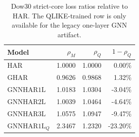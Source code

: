 \begin{table}[H]
\centering
\small
\begin{tabular}{lrrr}
\toprule
Model & \(\rho_M\) & \(\rho_Q\) & \(1-\rho_Q\) \\
\midrule
\(\mathrm{HAR}\) & 1.0000 & 1.0000 & 0.00\% \\
\(\mathrm{GHAR}\) & 0.9626 & 0.9868 & 1.32\% \\
\(\mathrm{GNNHAR1L}\) & 1.0183 & 1.0304 & -3.04\% \\
\(\mathrm{GNNHAR2L}\) & 1.0039 & 1.0464 & -4.64\% \\
\(\mathrm{GNNHAR3L}\) & 1.0575 & 1.0947 & -9.47\% \\
\(\mathrm{GNNHAR1L}_{Q}\) & 2.3467 & 1.2320 & -23.20\% \\
\bottomrule
\end{tabular}
\caption{Dow30 strict-core loss ratios relative to HAR.  The QLIKE-trained row is only available for the legacy one-layer GNN artifact.}
\label{tab:dow30-core-loss}
\end{table}
